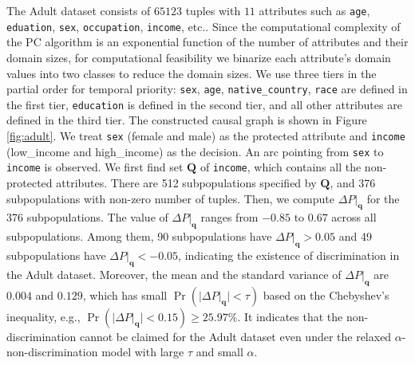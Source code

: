 \documentclass[twoside,leqno,twocolumn]{article}
\begin{document}
The Adult dataset consists of $65123$ tuples with $11$ attributes such as \texttt{age}, \texttt{eduation}, \texttt{sex}, \texttt{occupation}, \texttt{income}, etc.. Since the computational complexity of the PC algorithm is an exponential function of the number of attributes and their domain sizes, for computational feasibility we binarize each attribute's domain values into two classes to reduce the domain sizes. %
We use three tiers in the partial order for temporal priority: \texttt{sex}, \texttt{age}, \texttt{native\_country}, \texttt{race} are defined in the first tier, \texttt{education} is defined in the second tier, and all other attributes are defined in the third tier. The constructed causal graph is shown in Figure \ref{fig:adult}.
We treat \texttt{sex} (female and male) as the protected attribute and \texttt{income} (low\_income and high\_income) as the decision. An arc pointing from \texttt{sex} to \texttt{income} is observed.
We first find set $\mathbf{Q}$ of \texttt{income}, which contains all the non-protected attributes. There are 512 subpopulations specified by $\mathbf{Q}$, and 376 subpopulations with non-zero number of tuples. Then, we compute $\Delta P|_{\mathbf{q}}$ for the 376 subpopulations. 
The value of $\Delta P|_{\mathbf{q}}$ ranges from $-0.85$ to $0.67$ across all subpopulations. Among them, 90 subpopulations have $\Delta P|_{\mathbf{q}} > 0.05$ and 49 subpopulations have $\Delta P|_{\mathbf{q}} < -0.05$, indicating the existence of discrimination in the Adult dataset.
Moreover, the mean and the standard variance of $\Delta P|_{\mathbf{q}}$ are $0.004$ and $0.129$, which 
 has small $\Pr(|\Delta P|_{\mathbf{q}}| < \tau )$ based on the Chebyshev's inequality, e.g., $\Pr(|\Delta P|_{\mathbf{q}}| < 0.15)\geq 25.97\%$. It 
 indicates that the non-discrimination cannot be claimed for the Adult dataset even under the relaxed $\alpha$-non-discrimination model with large $\tau$ and small $\alpha$.
\end{document}
